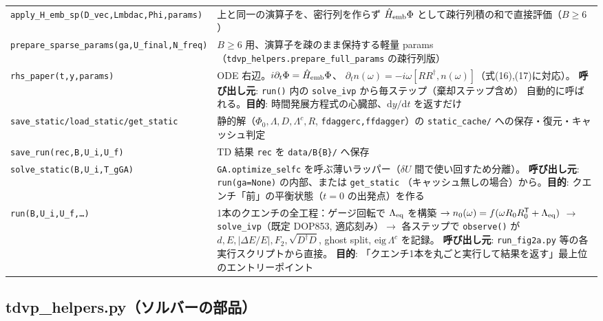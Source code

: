 \documentclass[11pt]{ltjsarticle}
\newcommand{\code}[1]{\texttt{#1}}
\begin{document}
\begin{longtable}{p{}p{}}
\code{apply\_H\_emb\_sp(D\_vec,Lmbdac,Phi,params)} & 上と同一の演算子を、密行列を作らず
$\hat H_{\rm emb}\Phi$ として疎行列積の和で直接評価（$B\ge6$）\\
\code{prepare\_sparse\_params(ga,U\_final,N\_freq)} & $B\ge6$ 用、演算子を疎のまま保持する軽量 params
（\code{tdvp\_helpers.prepare\_full\_params} の疎行列版）\\
\code{rhs\_paper(t,y,params)} & ODE 右辺。$i\partial_t\Phi=\hat H_{\rm emb}\Phi$、
$\partial_t n(\omega)=-i\omega[RR^\dagger,n(\omega)]$（式(16),(17)に対応）。
\textbf{呼び出し元}: \code{run()} 内の \code{solve\_ivp} から毎ステップ（棄却ステップ含め）
自動的に呼ばれる。\textbf{目的}: 時間発展方程式の心臓部、$\mathrm{d}y/\mathrm{d}t$ を返すだけ \\
\code{save\_static/load\_static/get\_static} & 静的解（$\Phi_0,\Lambda,D,\Lambda^c,R$,
\code{fdaggerc,ffdagger}）の \code{static\_cache/} への保存・復元・キャッシュ判定 \\
\code{save\_run(rec,B,U\_i,U\_f)} & TD 結果 \code{rec} を \code{data/B\{B\}/} へ保存 \\
\code{solve\_static(B,U\_i,T\_gGA)} & \code{GA.optimize\_selfc} を呼ぶ薄いラッパー（$\delta U$ 間で使い回すため分離）。
\textbf{呼び出し元}: \code{run(ga=None)} の内部、または \code{get\_static}
（キャッシュ無しの場合）から。\textbf{目的}: クエンチ「前」の平衡状態（$t=0$ の出発点）を作る \\
\code{run(B,U\_i,U\_f,\ldots)} & 1本のクエンチの全工程：ゲージ回転で $\Lambda_{\rm eq}$ を構築
$\to n_0(\omega)=f(\omega R_0R_0^{\mathsf T}+\Lambda_{\rm eq})$
$\to$ \code{solve\_ivp}（既定 DOP853, 適応刻み）$\to$ 各ステップで \code{observe()} が
$d,E,|\Delta E/E|,F_2,\sqrt{D^\dagger D}$, ghost split, $\mathrm{eig}\,\Lambda^c$ を記録。
\textbf{呼び出し元}: \code{run\_fig2a.py} 等の各実行スクリプトから直接。
\textbf{目的}: 「クエンチ1本を丸ごと実行して結果を返す」最上位のエントリーポイント \\
\bottomrule
\end{longtable}

\subsection*{tdvp\_helpers.py（ソルバーの部品）}
\end{document}
